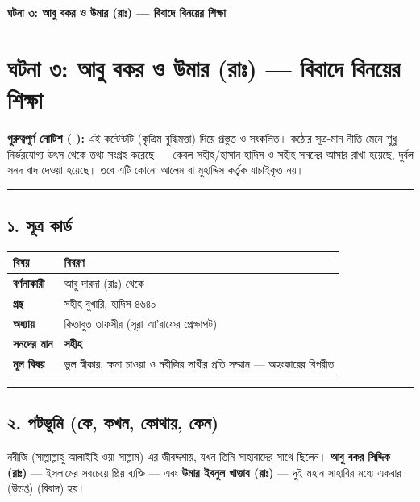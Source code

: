 

\begin{center}{\Large\bfseries\color{emerald} ঘটনা ৩: আবু বকর ও উমার (রাঃ) — বিবাদে বিনয়ের শিক্ষা}\end{center}
\vspace{1em}
\section*{ঘটনা ৩: আবু বকর ও উমার (রাঃ) — বিবাদে বিনয়ের শিক্ষা}

\begin{warnbox}
 \textbf{গুরুত্বপূর্ণ নোটিশ ( ):} এই কন্টেন্টটি  (কৃত্রিম বুদ্ধিমত্তা) দিয়ে প্রস্তুত ও সংকলিত।  কঠোর সূত্র-মান নীতি মেনে শুধু নির্ভরযোগ্য উৎস থেকে তথ্য সংগ্রহ করেছে — কেবল সহীহ/হাসান হাদিস ও সহীহ সনদের আসার রাখা হয়েছে, দুর্বল সনদ বাদ দেওয়া হয়েছে। তবে এটি কোনো আলেম বা মুহাদ্দিস কর্তৃক যাচাইকৃত নয়।
\end{warnbox}


\medskip\hrule\medskip

\subsection*{১. সূত্র কার্ড}

\begin{table}[h]\centering\small
\begin{tabular}{ll}
বিষয় & বিবরণ \\
\hline
\textbf{বর্ণনাকারী} & আবু দারদা (রাঃ) থেকে \\
\textbf{গ্রন্থ} & সহীহ বুখারি, হাদিস ৪৬৪০ \\
\textbf{অধ্যায়} & কিতাবুত তাফসীর (সূরা আ'রাফের প্রেক্ষাপট) \\
\textbf{সনদের মান} & \textbf{সহীহ} \\
\textbf{মূল বিষয়} & ভুল স্বীকার, ক্ষমা চাওয়া ও নবীজির সাথীর প্রতি সম্মান — অহংকারের বিপরীত \\
\hline
\end{tabular}
\end{table}

\medskip\hrule\medskip

\subsection*{২. পটভূমি (কে, কখন, কোথায়, কেন)}

নবীজি (সাল্লাল্লাহু আলাইহি ওয়া সাল্লাম)-এর জীবদ্দশায়, যখন তিনি সাহাবাদের সাথে ছিলেন। \textbf{আবু বকর সিদ্দিক (রাঃ)} — ইসলামের সবচেয়ে প্রিয় ব্যক্তি — এবং \textbf{উমার ইবনুল খাত্তাব (রাঃ)} — দুই মহান সাহাবির মধ্যে একবার  (উত্তপ্ত)  (বিবাদ) হয়।

